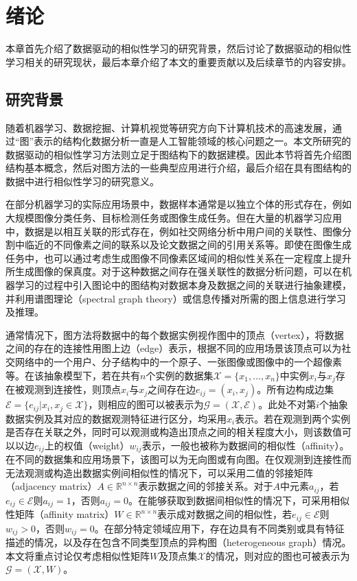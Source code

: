 \chapter{绪论}
本章首先介绍了数据驱动的相似性学习的研究背景，然后讨论了数据驱动的相似性学习相关的研究现状，最后本章介绍了本文的重要贡献以及后续章节的内容安排。
\section{研究背景}
随着机器学习、数据挖掘、计算机视觉等研究方向下计算机技术的高速发展，通过“图”\cite{chung1997spectral}表示的结构化数据分析一直是人工智能领域的核心问题之一。本文所研究的数据驱动的相似性学习方法则立足于图结构下的数据建模。因此本节将首先介绍图结构基本概念，然后对图方法的一些典型应用进行介绍，最后介绍在具有图结构的数据中进行相似性学习的研究意义。

在部分机器学习的实际应用场景中，数据样本通常是以独立个体的形式存在，例如大规模图像分类任务、目标检测任务或图像生成任务。但在大量的机器学习应用中，数据是以相互关联的形式存在，例如社交网络分析中用户间的关联性、图像分割中临近的不同像素之间的联系以及论文数据之间的引用关系等。即使在图像生成任务中，也可以通过考虑生成图像不同像素区域间的相似性关系在一定程度上提升所生成图像的保真度\cite{zhang2018self}。对于这种数据之间存在强关联性的数据分析问题，可以在机器学习的过程中引入图论中的图结构对数据本身及数据之间的关联进行抽象建模，并利用谱图理论（spectral graph theory）\cite{chung1997spectral}或信息传播对所需的图上信息进行学习及推理。

通常情况下，图方法将数据中的每个数据实例视作图中的顶点（vertex），将数据之间的存在的连接性用图上边（edge）表示，根据不同的应用场景该顶点可以为社交网络中的一个用户、分子结构中的一个原子、一张图像或图像中的一个超像素等。在该抽象模型下，若在共有$n$个实例的数据集$\mathcal{X}=\{x_1,\dots,x_n\}$中实例$x_i$与$x_j$存在被观测到连接性，则顶点$x_i$与$x_j$之间存在边$e_{ij}=(x_i, x_j)$。所有边构成边集$\mathcal{E}=\{e_{ij}|x_i, x_j\in \mathcal{X}\}$，则相应的图可以被表示为$\mathcal{G} = (\mathcal{X}, \mathcal{E})$。此处不对第$i$个抽象数据实例及其对应的数据观测特征进行区分，均采用$x_i$表示。若在观测到两个实例是否存在关联之外，同时可以观测或构造出顶点之间的相关程度大小，则该数值可以以边$e_{ij}$上的权值（weight）$w_{ij}$表示，一般也被称为数据间的相似性（affinity）。在不同的数据集和应用场景下，该图可以为无向图或有向图。在仅观测到连接性而无法观测或构造出数据实例间相似性的情况下，可以采用二值的邻接矩阵（adjacency matrix）$A\in\mathbb{R}^{n\times n}$表示数据之间的邻接关系。对于$A$中元素$a_{ij}$，若$e_{ij}\in \mathcal{E}$则$a_{ij}=1$，否则$a_{ij}=0$。在能够获取到数据间相似性的情况下，可采用相似性矩阵（affinity matrix）$W\in\mathbb{R}^{n\times n}$表示成对数据之间的相似性，若$e_{ij}\in \mathcal{E}$则$w_{ij}>0$，否则$w_{ij}=0$。在部分特定领域应用下，存在边具有不同类别或具有特征描述的情况，以及存在包含不同类型顶点的异构图（heterogeneous graph）情况。本文将重点讨论仅考虑相似性矩阵$W$及顶点集$\mathcal{X}$的情况，则对应的图也可被表示为$\mathcal{G} = (\mathcal{X}, W)$。

